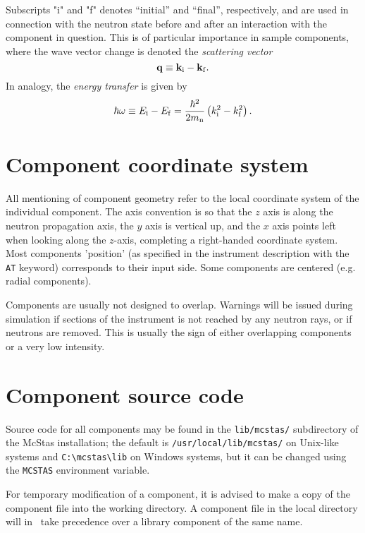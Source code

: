 Subscripts "i" and "f" denotes ``initial'' and ``final'', respectively,
and are used in connection with the neutron state before and after
an interaction with the component in question.
This is of particular importance in sample components, where the
wave vector change is denoted the {\em scattering vector}
\begin{equation}
{\bf q} \equiv {\bf k}_{\rm i} - {\bf k}_{\rm f} .
\end{equation}
In analogy, the {\em energy transfer} is given by
\begin{equation}
\hbar \omega \equiv E_{\rm i}-E_{\rm f} = 
\frac{\hbar^2}{2 m_{\rm n}} \left( k_{\rm i}^2 - k_{\rm f}^2 \right).
\end{equation}

\section{Component coordinate system}
All mentioning of component geometry refer to
the local coordinate system of the individual component.
The axis convention is so that the $z$ axis is along
the neutron propagation axis, the $y$ axis is vertical up,
and the $x$ axis points left when looking along the $z$-axis, 
completing a right-handed coordinate system.
Most components 'position' (as specified in the instrument description 
with the \verb+AT+ keyword) corresponds to their input side. 
Some components are centered (e.g. radial components).

Components are usually not designed to overlap. 
Warnings will be issued during simulation if sections of the instrument
is not reached by any neutron rays, or if neutrons are removed.
This is usually the sign of either overlapping components 
or a very low intensity.

\section{Component source code}
Source code for all components may be found in the \verb+lib/mcstas/+
subdirectory of the McStas installation;
the default is \verb+/usr/local/lib/mcstas/+
on Unix-like systems and \verb+C:\mcstas\lib+ on Windows systems, but it can be
changed using the \verb+MCSTAS+ environment variable.

For temporary modification of a component, it is advised to make a copy
of the component file into the working directory.
A component file in the local directory will in \MCS\ take precedence over 
a library component of the same name.   

